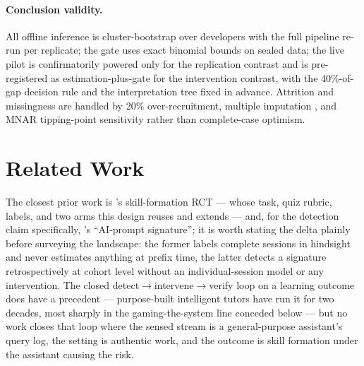 \documentclass[11pt]{article}
\begin{document}
\paragraph{Conclusion validity.}
All offline inference is cluster-bootstrap over developers with the full pipeline re-run per replicate; the gate uses exact binomial bounds \citep{clopper1934use} on sealed data; the live pilot is confirmatorily powered only for the replication contrast and is pre-registered as estimation-plus-gate for the intervention contrast, with the 40\%-of-gap decision rule and the interpretation tree fixed in advance. Attrition and missingness are handled by 20\% over-recruitment, multiple imputation \citep{rubin1987multiple}, and MNAR tipping-point sensitivity rather than complete-case optimism.

\section{Related Work}

The closest prior work is \citet{shen2026skill}'s skill-formation RCT --- whose task, quiz rubric, labels, and two arms this design reuses and extends --- and, for the detection claim specifically, \citet{yao2026scaffold}'s ``AI-prompt signature''; it is worth stating the delta plainly before surveying the landscape: the former labels complete sessions in hindsight and never estimates anything at prefix time, the latter detects a signature retrospectively at cohort level without an individual-session model or any intervention. The closed detect$\to$intervene$\to$verify loop on a learning outcome does have a precedent --- purpose-built intelligent tutors have run it for two decades, most sharply in the gaming-the-system line conceded below --- but no work closes that loop where the sensed stream is a general-purpose assistant's query log, the setting is authentic work, and the outcome is skill formation under the assistant causing the risk.
\end{document}
